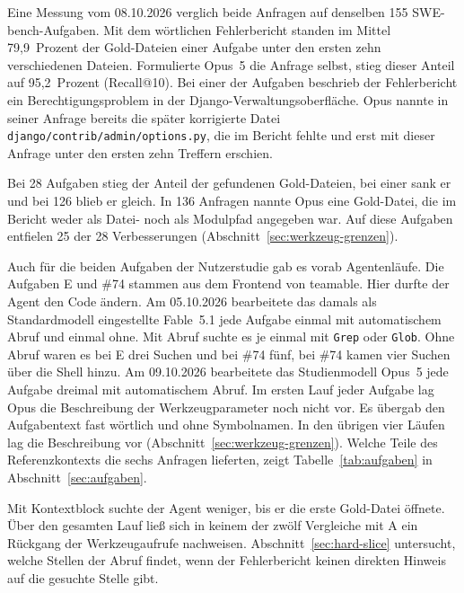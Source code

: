 \begin{ungelesen}
{Eine Messung vom 08.10.2026 verglich beide Anfragen auf denselben 155 SWE-bench-Aufgaben. Mit dem wörtlichen Fehlerbericht standen im Mittel 79,9~Prozent der Gold-Dateien einer Aufgabe unter den ersten zehn verschiedenen Dateien. Formulierte Opus~5 die Anfrage selbst, stieg dieser Anteil auf 95,2~Prozent (Recall@10). Bei einer der Aufgaben beschrieb der Fehlerbericht ein Berechtigungsproblem in der Django-Verwaltungsoberfläche. Opus nannte in seiner Anfrage bereits die später korrigierte Datei \texttt{django/contrib/admin/options.py}, die im Bericht fehlte und erst mit dieser Anfrage unter den ersten zehn Treffern erschien.

Bei 28 Aufgaben stieg der Anteil der gefundenen Gold-Dateien, bei einer sank er und bei 126 blieb er gleich. In 136 Anfragen nannte Opus eine Gold-Datei, die im Bericht weder als Datei- noch als Modulpfad angegeben war. Auf diese Aufgaben entfielen 25 der 28 Verbesserungen (Abschnitt~\ref{sec:werkzeug-grenzen}).

Auch für die beiden Aufgaben der Nutzerstudie gab es vorab Agentenläufe. Die Aufgaben E und \#74 stammen aus dem Frontend von teamable. Hier durfte der Agent den Code ändern. Am 05.10.2026 bearbeitete das damals als Standardmodell eingestellte Fable~5.1 jede Aufgabe einmal mit automatischem Abruf und einmal ohne. Mit Abruf suchte es je einmal mit \texttt{Grep} oder \texttt{Glob}. Ohne Abruf waren es bei E drei Suchen und bei \#74 fünf, bei \#74 kamen vier Suchen über die Shell hinzu. Am 09.10.2026 bearbeitete das Studienmodell Opus~5 jede Aufgabe dreimal mit automatischem Abruf. Im ersten Lauf jeder Aufgabe lag Opus die Beschreibung der Werkzeugparameter noch nicht vor. Es übergab den Aufgabentext fast wörtlich und ohne Symbolnamen. In den übrigen vier Läufen lag die Beschreibung vor (Abschnitt~\ref{sec:werkzeug-grenzen}). Welche Teile des Referenzkontexts die sechs Anfragen lieferten, zeigt Tabelle~\ref{tab:aufgaben} in Abschnitt~\ref{sec:aufgaben}.

Mit Kontextblock suchte der Agent weniger, bis er die erste Gold-Datei öffnete. Über den gesamten Lauf ließ sich in keinem der zwölf Vergleiche mit A ein Rückgang der Werkzeugaufrufe nachweisen. Abschnitt~\ref{sec:hard-slice} untersucht, welche Stellen der Abruf findet, wenn der Fehlerbericht keinen direkten Hinweis auf die gesuchte Stelle gibt.
}
\end{ungelesen}

